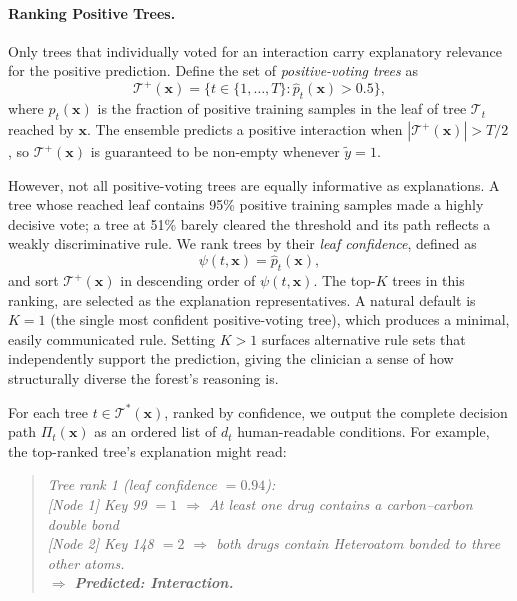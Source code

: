 \documentclass[letterpaper]{article} %
\begin{document}
\paragraph{Ranking Positive Trees.}
Only trees that individually voted for an interaction carry explanatory
relevance for the positive prediction.  Define the set of
\emph{positive-voting trees} as
\begin{equation}
    \mathcal{T}^{+}(\mathbf{x}) =
    \bigl\{t \in \{1,\ldots,T\} : \hat{p}_t(\mathbf{x}) > 0.5\bigr\},
    \label{eq:pos_trees}
\end{equation}
where $\hat{p}_t(\mathbf{x})$ is the fraction of positive training
samples in the leaf of tree $\mathcal{T}_t$ reached by $\mathbf{x}$.
The ensemble predicts a positive interaction when
$|\mathcal{T}^{+}(\mathbf{x})| > T/2$, so $\mathcal{T}^{+}(\mathbf{x})$
is guaranteed to be non-empty whenever $\tilde{y} = 1$.
 
However, not all positive-voting trees are equally informative as explanations.
A tree whose reached leaf contains 95\% positive training samples made
a highly decisive vote; a tree at 51\% barely cleared the threshold and
its path reflects a weakly discriminative rule.  We rank trees by their
\emph{leaf confidence}, defined as
\begin{equation}
    \psi(t, \mathbf{x}) = \hat{p}_t(\mathbf{x}),
    \label{eq:tree_score}
\end{equation}
and sort $\mathcal{T}^{+}(\mathbf{x})$ in descending order of
$\psi(t, \mathbf{x})$.  The top-$K$ trees in this ranking, are selected as the explanation representatives.
A natural default is $K = 1$ (the single most confident positive-voting
tree), which produces a minimal, easily communicated rule.
Setting $K > 1$ surfaces alternative rule sets that independently
support the prediction, giving the clinician a sense of how
structurally diverse the forest's reasoning is.
 
For each tree $t \in \mathcal{T}^{*}(\mathbf{x})$, ranked by confidence,
we output the complete decision path $\Pi_t(\mathbf{x})$ as an ordered
list of $d_t$ human-readable conditions.  For example, the top-ranked
tree's explanation might read:
\begin{quote}
\emph{Tree rank 1 (leaf confidence $= 0.94$):}\\
\emph{[Node 1]\; Key 99 $= 1$\;
$\Rightarrow$ At least one drug contains a carbon–carbon double bond}\\
\emph{[Node 2]\; Key 148 $= 2$\;
$\Rightarrow$ both drugs contain Heteroatom bonded to three other atoms.}\\
\emph{$\Rightarrow$ \textbf{Predicted: Interaction.}}
\end{quote}
\end{document}
